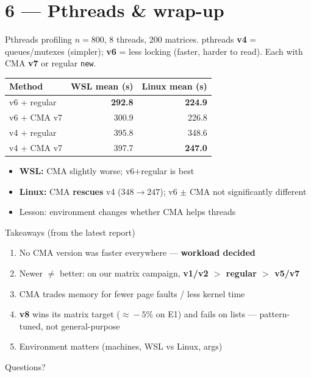 \section{6 --- Pthreads \& wrap-up}

\begin{frame}{Pthreads profiling}
    {\footnotesize \(n{=}800\), 8 threads, 200 matrices.
    pthreads \textbf{v4} = queues/mutexes (simpler);
    \textbf{v6} = less locking (faster, harder to read).
    Each with CMA \textbf{v7} or regular \texttt{new}.}

    \vspace{0.3em}
    {\scriptsize
    \begin{tabular}{@{}lrr@{}}
        \toprule
        Method & WSL mean (s) & Linux mean (s) \\
        \midrule
        v6 + regular & \textbf{292.8} & \textbf{224.9} \\
        v6 + CMA v7 & 300.9 & 226.8 \\
        v4 + regular & 395.8 & 348.6 \\
        v4 + CMA v7 & 397.7 & \textbf{247.0} \\
        \bottomrule
    \end{tabular}
    }

    \vspace{0.5em}
    \begin{itemize}
        \item \textbf{WSL:} CMA slightly worse; v6+regular is best
        \item \textbf{Linux:} CMA \textbf{rescues} v4 (\(348{\rightarrow}247\));
              v6 \(\pm\) CMA not significantly different
        \item Lesson: environment changes whether CMA helps threads
    \end{itemize}
\end{frame}

\begin{frame}{Takeaways (from the latest report)}
    \begin{enumerate}
        \item No CMA version was faster everywhere --- \textbf{workload decided}
        \item Newer \(\neq\) better: on our matrix campaign,
              \textbf{v1/v2 \(>\) regular \(>\) v5/v7}
        \item CMA trades memory for fewer page faults / less kernel time
        \item \textbf{v8} wins its matrix target (\(\approx\!-5\%\) on E1) and
              fails on lists --- pattern-tuned, not general-purpose
        \item Environment matters (machines, WSL vs Linux, args)
    \end{enumerate}

    \vspace{0.5em}
    \centering
    {\Large Questions?}
\end{frame}
